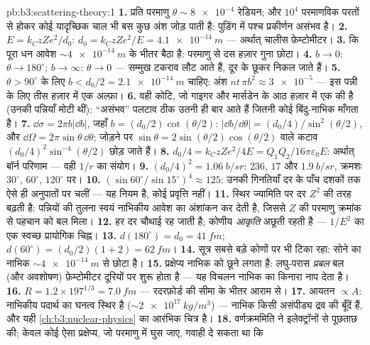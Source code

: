 \begin{solution}{pb:b3:scattering-theory:1}
\textbf{1.} प्रति परमाणु $\theta \sim \num{8e-4}$ रेडियन; और
$10^4$ परमाणविक परतों से होकर कोई यादृच्छिक चाल भी बस कुछ अंश जोड़
पाती है: पुडिंग में पश्च प्रकीर्णन असंभव है।
\textbf{2.} $E = k_CzZe^2/d_0$: $d_0 = k_CzZe^2/E =
\qty{4.1e-14}{m}$ --- अर्थात् चालीस फ़ेम्टोमीटर।
\textbf{3.} कि पूरा धन आवेश
$\sim\qty{4e-14}{m}$ के भीतर बैठा है: परमाणु से दस हज़ार गुना छोटा।
\textbf{4.} $b \to 0$: $\theta \to 180^\circ$; $b \to \infty$:
$\theta \to 0$ --- सम्मुख टकराव लौट आते हैं, दूर के छूकर निकल जाते
हैं।
\textbf{5.} $\theta > 90^\circ$ के लिए $b < d_0/2 =
\qty{2.1e-14}{m}$ चाहिए: अंश $nt\,\pi b^2 \approx \num{3e-5}$ ---
इस पन्नी के लिए तीस हज़ार में एक अल्फ़ा।
\textbf{6.} वही कोटि, जो गाइगर और मार्सडेन के आठ हज़ार में एक की है
(उनकी पन्नियाँ मोटी थीं): ``असंभव'' पलटाव ठीक उतनी ही बार आते हैं
जितनी कोई बिंदु-नाभिक माँगता है।
\textbf{7.} $\dd\sigma = 2\pi b|\dd b|$, जहाँ $b =
(d_0/2)\cot(\theta/2)$: $|\dd b/\dd\theta| = (d_0/4)/\sin^2(
\theta/2)$, और $\dd\Omega = 2\pi\sin\theta\,\dd\theta$;
जोड़ने पर $\sin\theta = 2\sin(\theta/2)\cos(\theta/2)$ वाले
कटाव $(d_0/4)^2\sin^{-4}(\theta/2)$ छोड़ जाते हैं।
\textbf{8.} $d_0/4 = k_CzZe^2/4E = Q_1Q_2/16\pi\varepsilon_0E$:
अर्थात् बॉर्न परिणाम --- वही $1/r$ का संयोग।
\textbf{9.} $(d_0/4)^2 = \qty{1.06}{b/sr}$: $236$, $17$ और
$\qty{1.9}{b/sr}$, क्रमशः $30^\circ$, $60^\circ$, $120^\circ$ पर।
\textbf{10.} $(\sin60^\circ/\sin15^\circ)^4 \approx 125$: उनकी
गिनतियाँ दर के पाँच दशकों तक ऐसे ही अनुपातों पर चलीं --- यह नियम
है, कोई प्रवृत्ति नहीं।
\textbf{11.} स्थिर ज्यामिति पर दर $Z^2$ की तरह बढ़ती है:
पन्नियों की तुलना स्वयं नाभिकीय आवेश का अंशांकन कर देती है, जिससे
$Z$ की परमाणु क्रमांक से पहचान को बल मिला।
\textbf{12.} हर दर चौथाई रह जाती है; कोणीय \emph{आकृति}
अछूती रहती है --- $1/E^2$ का एक स्वच्छ प्रायोगिक चिह्न।
\textbf{13.} $d(180^\circ) = d_0 = \qty{41}{fm}$; $d(60^\circ) =
(d_0/2)(1 + 2) = \qty{62}{fm}$।
\textbf{14.} सूत्र सबसे बड़े कोणों पर भी टिका रहा: सोने का
नाभिक $\sim\qty{4e-14}{m}$ से छोटा है।
\textbf{15.} प्रक्षेप्य नाभिक को छूने लगता है: लघु-परास
\emph{प्रबल} बल (और अवशोषण) फ़ेम्टोमीटर दूरियों पर शुरू होता है ---
यह विचलन नाभिक का किनारा नाप देता है।
\textbf{16.} $R = 1.2 \times 197^{1/3} = \qty{7.0}{fm}$ ---
रदरफ़ोर्ड की सीमा के भीतर आराम से।
\textbf{17.} आयतन $\propto A$: नाभिकीय पदार्थ का घनत्व स्थिर है
($\sim\qty{2e17}{kg/m^3}$) --- नाभिक किसी असंपीड्य द्रव की बूँदें
हैं, और यही \cref{ch:b3:nuclear-physics} का आरंभिक चित्र है।
\textbf{18.} वर्णक्रममिति ने इलेक्ट्रॉनों से पूछताछ की; केवल कोई
ऐसा प्रक्षेप्य, जो परमाणु में घुस जाए, गवाही दे सकता था कि

\end{solution}
